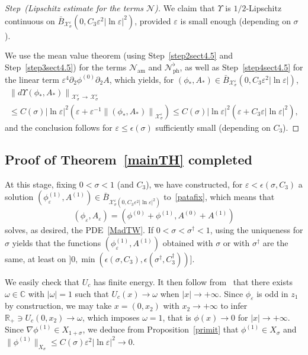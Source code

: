 \documentclass[10pt]{amsart}
\theoremstyle{definition}\newtheorem{defi}[theo]{Definition}\newtheorem{rema}[theo]{Remark}\newtheorem{exam}[theo]{Example}\newtheorem{exem}[theo]{Example}\newtheorem{nota}[theo]{Notation}
\newcommand*\p{\partial}
\newcommand*\R{\mathbb R}
\newcommand*\C{\mathbb C}
\newcommand{\amm}{\mathrm{am}}
\newcommand{\phl}{\mathrm{ph}}
\newcommand*\BN{\mathcal{N}}
\newcommand*\BX{\mathcal{X}}
\newcommand*\ii{\infty}
\newcommand*\ls{\leqslant }
\newcommand*\e{\varepsilon}
\newcommand*\ep{\epsilon}
\newcommand*\lne{\lvert \ln \varepsilon \rvert}
\newcommand*\s{\sigma}
\newcounter{stepcount}
\newenvironment{step}[1]{\refstepcounter{stepcount}\begin{proof}[{Step~\thestepcount}{\;(#1)}]}{\let\qed\relax\end{proof}}
\begin{document}
\begin{step}{{Lipschitz estimate for the terms $ \BN $}}\label{step6sect4.5}
We claim that $ \Upsilon $ is $1/2 $-Lipschitz continuous on $ \bar{B}_{\BX^{\e}_{ \s} }(0, C_3 \e^2 \lne^2) $, provided $ \e $ is small enough (depending on $ \s $).

We use the mean value theorem (using Step~\ref{step2sect4.5} and Step~\ref{step3sect4.5}) for the terms $ \BN_{\amm} $ and $ \BN_{\phl}^\flat $, as well as Step~\ref{step4sect4.5} for the linear term $ \e^4 \p_2 \phi^{(0)} \p_2 A $, which yields, for $ (\phi_*, A_*) \in \bar{B}_{\BX^{\e}_{ \s} }(0, C_3 \e^2 \lne) $,
\begin{multline*}
\left\| d \Upsilon (\phi_*, A_*)\right\|_{ \BX^\e_\s \,\to\,\BX^\e_{\s}}\\
\ls C (\s) \lne^2 \left(\e + \e^{-1} \left\| (\phi_*, A_*) \right\|_{ \BX^\e_\s } \right)
\ls C (\s) \lne^2 \left(\e + C_3 \e \lne^2 \right),
\end{multline*}
and the conclusion follows for $ \e \ls \ep (\s) $ sufficiently small (depending on $C_3 $).
\end{step}



\subsection{Proof of Theorem~\ref{mainTH} completed}\label{mainTH_complete}

At this stage, fixing $ 0 < \s < 1$ (and $ C_3 $), we have constructed, for $ \e < \ep(\s, C_3) $ a solution $ (\phi ^{(1)}_\e, A^{(1)}) \in \bar{B}_{ \BX^\e_\s (0, C_3 \e^2 \lne^2) } $ to~\eqref{patafix}, which means that
\[
(\phi_\e, A_\e) = \left(\phi^{(0)} + \phi^{(1)}, A^{(0)} + A^{(1)}\right)
\]
solves, as desired, the PDE~\eqref{MadTW}. If $ 0 < \s < \s^\dag < 1 $, using the uniqueness for $ \s $ yields that the functions $ (\phi ^{(1)}_\e, A^{(1)}) $ obtained with $ \s$ or with $ \s^\dag $ are the same, at least on $]0, \min(\ep(\s, C_3), \ep(\s^\dag, C_3 ^\dag))] $.

We easily check that $ U_c $ has finite energy. It then follow from~\cite{Gra_decay} that there exists $ \omega \in \C $ with $ \lvert \omega \rvert = 1 $ such that $ U_c(x) \to \omega $ when $ |x| \to+\ii $. Since $ \phi_\e $ is odd in $z_1 $ by construction, we may take $ x = (0,x_2) $ with $ x_2 \to+\ii $ to infer $ \R_+ \ni U_c(0, x_2) \to \omega $, which imposes $ \omega = 1 $, that is $ \phi (x) \to 0 $ for $ |x| \to +\ii $. Since $ \nabla \phi^{(1)} \in X_{1+\s} $, we deduce from Proposition~\ref{primit} that $ \phi^{(1)} \in X_\s $ and $ \| \phi^{(1)} \|_{ X_\s } \ls C(\s) \e^2 \lne^2 \to 0 $.
\end{document}
